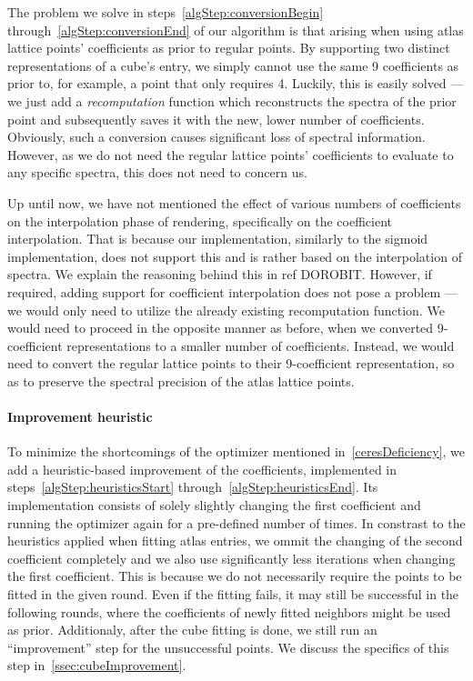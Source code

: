 The problem we solve in steps~\ref{algStep:conversionBegin} through~\ref{algStep:conversionEnd} of our algorithm is that arising when using atlas lattice points' coefficients as prior to regular points. By supporting two distinct representations of a cube's entry, we simply cannot use the same 9 coefficients as prior to, for example, a point that only requires 4. Luckily, this is easily solved --- we just add a \emph{recomputation} function which reconstructs the spectra of the prior point and subsequently saves it with the new, lower number of coefficients. Obviously, such a conversion causes significant loss of spectral information. However, as we do not need the regular lattice points' coefficients to evaluate to any specific spectra, this does not need to concern us.

Up until now, we have not mentioned the effect of various numbers of coefficients on the interpolation phase of rendering, specifically on the coefficient interpolation. That is because our implementation, similarly to the sigmoid implementation, does not support this and is rather based on the interpolation of spectra. We explain the reasoning behind this in ref DOROBIT. However, if required, adding support for coefficient interpolation does not pose a problem --- we would only need to utilize the already existing recomputation function. We would need to proceed in the opposite manner as before, when we converted 9-coefficient representations to a smaller number of coefficients. Instead, we would need to convert the regular lattice points to their 9-coefficient representation, so as to preserve the spectral precision of the atlas lattice points.

\paragraph{Improvement heuristic}

To minimize the shortcomings of the optimizer mentioned in~\cref{ceresDeficiency}, we add a heuristic-based improvement of the coefficients, implemented in steps~\ref{algStep:heuristicsStart} through~\ref{algStep:heuristicsEnd}. Its implementation consists of solely slightly changing the first coefficient and running the optimizer again for a pre-defined number of times. In constrast to the heuristics applied when fitting atlas entries, we ommit the changing of the second coefficient completely and we also use significantly less iterations when changing the first coefficient. This is because we do not necessarily require the points to be fitted in the given round. Even if the fitting fails, it may still be successful in the following rounds, where the coefficients of newly fitted neighbors might be used as prior. Additionaly, after the cube fitting is done, we still run an ``improvement'' step for the unsuccessful points. We discuss the specifics of this step in~\cref{ssec:cubeImprovement}.

